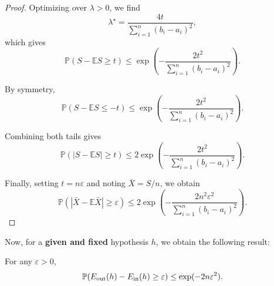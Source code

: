 \documentclass[../main]{subfiles}
\begin{document}
\begin{proof}
    Optimizing over $\lambda > 0$, we find
    \begin{equation}
    \lambda^\star = \frac{4t}{\sum_{i=1}^n (b_i - a_i)^2},
    \end{equation}
    which gives
    \begin{equation}
    \mathbb{P}(S - \mathbb{E}S \ge t)
    \le \exp\!\left(-\frac{2t^2}{\sum_{i=1}^n (b_i - a_i)^2}\right).
    \end{equation}
    
    By symmetry,
    \begin{equation}
    \mathbb{P}(S - \mathbb{E}S \le -t)
    \le \exp\!\left(-\frac{2t^2}{\sum_{i=1}^n (b_i - a_i)^2}\right).
    \end{equation}
    
    Combining both tails gives
    \begin{equation}
    \mathbb{P}\!\left(|S - \mathbb{E}S| \ge t\right)
    \le 2\exp\!\left(-\frac{2t^2}{\sum_{i=1}^n (b_i - a_i)^2}\right).
    \end{equation}
    
    Finally, setting $t = n\varepsilon$ and noting $\bar X = S/n$, we obtain
    \begin{equation}
    \mathbb{P}\!\left(|\bar X - \mathbb{E}\bar X| \ge \varepsilon\right)
    \le 2\exp\!\left(-\frac{2n^2\varepsilon^2}{\sum_{i=1}^n (b_i - a_i)^2}\right).
    \end{equation}
\end{proof}
Now, for a \textbf{given and fixed} hypothesis $h$, we obtain the following result:

\begin{theorem}
For any $\varepsilon > 0$,
\begin{equation}
    \mathbb{P}\!\left(E_{\rm out}(h) - E_{\rm in}(h) \ge \varepsilon\right)
    \le \exp(-2n\varepsilon^2).
\end{equation}
\end{theorem}
\end{document}
